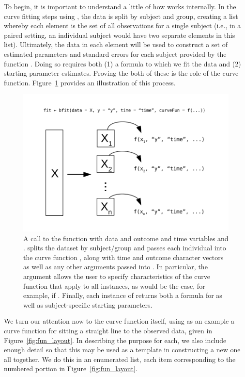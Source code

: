 To begin, it is important to understand a little of how  works internally. In the curve fitting steps using , the data is split by subject and group, creating a list whereby each element is the set of all observations for a single subject (i.e., in a paired setting, an individual subject would have two separate elements in this list). Ultimately, the data in each element will be used to construct a set of estimated parameters and standard errors for each subject provided by the function . Doing so requires both (1) a formula to which  we fit the data and (2) starting parameter estimates. Proving the both of these is the role of the curve function. Figure~\ref{fig:curve_split} provides an illustration of this process.



\begin{figure}
\centering
\includegraphics{img/curve_split.pdf}
\caption{A call to the function  with data  and outcome and time variables  and .  splits the dataset  by subject/group and passes each individual  into the curve function , along with time and outcome character vectors as well as any other arguments passed into . In particular, the  argument allows the user to specify characteristics of the curve function that apply to all instances, as would be the case, for example, if . Finally, each instance of  returns both a formula for  as well as subject-specific starting parameters.}
\label{fig:curve_split}
\end{figure}

We turn our attention now to the curve function itself, using as an example a curve function for sitting a straight line to the observed data, given in Figure~\ref{fig:fun_layout}. In describing the purpose for each, we also include enough detail so that this may be used as a template in constructing a new one all together. We do this in an enumerated list, each item corresponding to the numbered portion in Figure~\ref{fig:fun_layout}.

